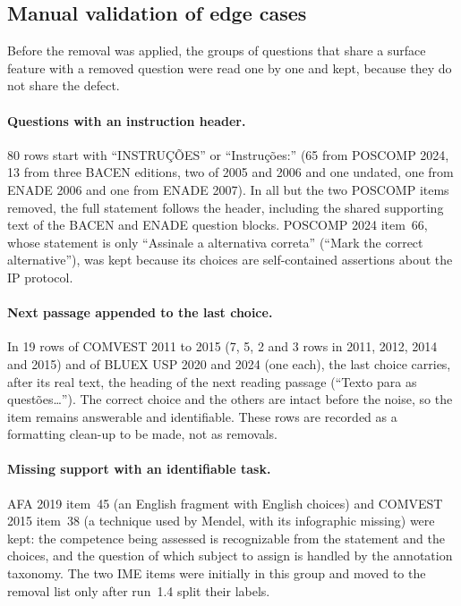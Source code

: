 \subsection{Manual validation of edge cases}
\label{app:rev-validation}

Before the removal was applied, the groups of questions that share a surface
feature with a removed question were read one by one and kept, because they
do not share the defect.

\paragraph{Questions with an instruction header.} 80 rows start with
``INSTRUÇÕES'' or ``Instruções:'' (65 from POSCOMP 2024, 13 from three BACEN
editions, two of 2005 and 2006 and one undated, one from ENADE 2006 and one
from ENADE 2007). In all but the two POSCOMP items removed, the full
statement follows the header, including the shared supporting text of the
BACEN and ENADE question blocks. POSCOMP 2024 item~66,
whose statement is only ``Assinale a alternativa correta'' (``Mark the correct
alternative''), was kept because its choices are self-contained assertions
about the IP protocol.

\paragraph{Next passage appended to the last choice.} In 19 rows of COMVEST
2011 to 2015 (7, 5, 2 and 3 rows in 2011, 2012, 2014 and 2015) and of BLUEX
USP 2020 and 2024 (one each), the last choice carries, after its real text,
the heading of the next reading passage (``Texto para as questões\ldots''). The
correct choice and the others are intact before the noise, so the item
remains answerable and identifiable. These rows are recorded as a formatting
clean-up to be made, not as removals.

\paragraph{Missing support with an identifiable task.} AFA 2019 item~45 (an
English fragment with English choices) and COMVEST 2015 item~38 (a technique
used by Mendel, with its infographic missing) were kept: the competence being
assessed is recognizable from the statement and the choices, and the question
of which subject to assign is handled by the annotation taxonomy. The two IME
items were initially in this group and moved to the removal list only after
run~1.4 split their labels.

